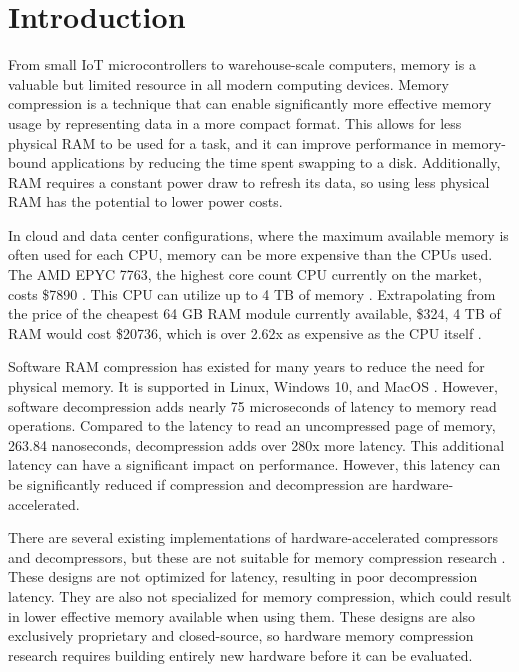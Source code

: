 \documentclass[doublespace,nopageskip]{VTthesis}
\begin{document}
\chapter{Introduction} \label{ch:introduction}
From small IoT microcontrollers to warehouse-scale computers, memory is a valuable but limited resource in all modern computing devices. Memory compression is a technique that can enable significantly more effective memory usage by representing data in a more compact format. This allows for less physical RAM to be used for a task, and it can improve performance in memory-bound applications by reducing the time spent swapping to a disk. Additionally, RAM requires a constant power draw to refresh its data, so using less physical RAM has the potential to lower power costs.

In cloud and data center configurations, where the maximum available memory is often used for each CPU, memory can be more expensive than the CPUs used. The AMD EPYC 7763, the highest core count CPU currently on the market, costs \$7890 \cite{epyc_price}. This CPU can utilize up to 4 TB of memory \cite{ibm_epyc}. Extrapolating from the price of the cheapest 64 GB RAM module currently available, \$324, 4 TB of RAM would cost \$20736, which is over 2.62x as expensive as the CPU itself \cite{memory_price}.

Software RAM compression has existed for many years to reduce the need for physical memory. It is supported in Linux, Windows 10, and MacOS \cite{linux_memory_compression, windows10_memory_compression, macos_memory_compression}. However, software decompression adds nearly 75 microseconds of latency to memory read operations. Compared to the latency to read an uncompressed page of memory, 263.84 nanoseconds, decompression adds over 280x more latency. This additional latency can have a significant impact on performance. However, this latency can be significantly reduced if compression and decompression are hardware-accelerated.

There are several existing implementations of hardware-accelerated compressors and decompressors, but these are not suitable for memory compression research \cite{ibm,microsoft}. These designs are not optimized for latency, resulting in poor decompression latency. They are also not specialized for memory compression, which could result in lower effective memory available when using them. These designs are also exclusively proprietary and closed-source, so hardware memory compression research requires building entirely new hardware before it can be evaluated.
\end{document}
